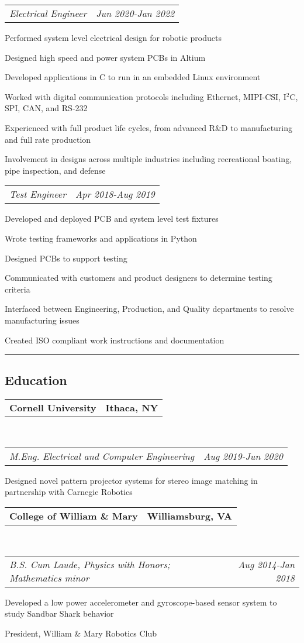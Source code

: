 \documentclass[10pt,letterpaper]{article}
\makeatletter
\newcommand{\headerrow}[2]
{\begin{tabular*}{\linewidth}{l@{\extracolsep{\fill}}r}
	#1 &
	#2 \\
\end{tabular*}}
\makeatother
\begin{document}
	\headerrow
		{\emph{Electrical Engineer}}
		{\emph{Jun 2020-Jan 2022}}
	\begin{itemize*}
		\item Performed system level electrical design for robotic products
		\item Designed high speed and power system PCBs in Altium
		\item Developed applications in C to run in an embedded Linux environment
		\item Worked with digital communication protocols including Ethernet, MIPI-CSI, I$^2$C, SPI, CAN, and RS-232
		\item Experienced with full product life cycles, from advanced R\&D to manufacturing and full rate production
		\item Involvement in designs across multiple industries including recreational boating, pipe inspection, and defense
		
	\end{itemize*}
	\headerrow
		{\emph{Test Engineer}}
		{\emph{Apr 2018-Aug 2019}}
	\begin{itemize*}
		\item Developed and deployed PCB and system level test fixtures
		\item Wrote testing frameworks and applications in Python		
		\item Designed PCBs to support testing
		\item Communicated with customers and product designers to determine testing criteria
		\item Interfaced between Engineering, Production, and Quality departments to resolve manufacturing issues
		\item Created ISO compliant work instructions and documentation
	\end{itemize*}

\hrule
\vspace{-0.4em}
\subsection*{Education}
	\headerrow
		{\textbf{Cornell University}}
		{\textbf{Ithaca, NY}}
		\\
	\headerrow
		{\emph{M.Eng. Electrical and Computer Engineering}}
		{\emph{Aug 2019-Jun 2020}}
	\begin{itemize*}
		\item Designed novel pattern projector systems for stereo image matching in partnership with Carnegie Robotics
	\end{itemize*}
	\headerrow
		{\textbf{College of William \& Mary}}
		{\textbf{Williamsburg, VA}}
	\\
	\headerrow
		{\emph{B.S. Cum Laude, Physics with Honors; Mathematics minor}}
		{\emph{Aug 2014-Jan 2018}}
	\begin{itemize*}
		\item Developed a low power accelerometer and gyroscope-based sensor system to study Sandbar Shark behavior
		\item President, William \& Mary Robotics Club
	\end{itemize*}
\end{document}
